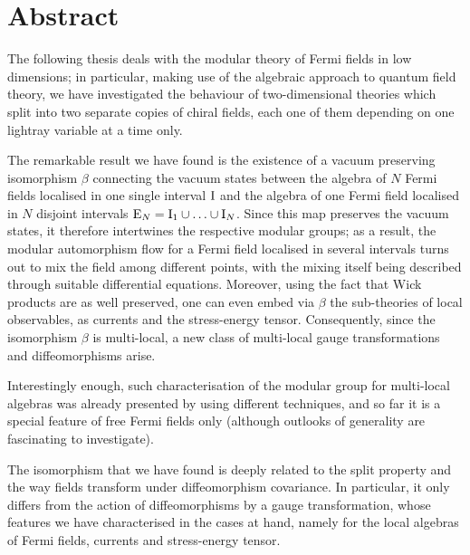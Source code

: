 \begingroup
\let\clearpage\relax
\let\cleardoublepage\relax
\let\cleardoublepage\relax

\chapter*{Abstract}
The following thesis deals with the modular theory of 
Fermi fields in low dimensions; in particular, making 
use of the algebraic approach to quantum field theory,
we have investigated the behaviour of two-dimensional 
theories which split into two separate copies of chiral
fields, each one of them depending on one lightray variable 
at a time only.

The remarkable result we have found is the existence of 
a vacuum preserving isomorphism $\beta$ connecting the 
vacuum states between the algebra of $N$ Fermi fields 
localised in one single interval $\textrm{I}$ and the algebra 
of one Fermi field localised in $N$ disjoint intervals 
$\textrm{E}_N=\textrm{I}_1\cup\ldots\cup \textrm{I}_N$. Since this 
map preserves the vacuum states, it therefore intertwines 
the respective modular groups; as a result, the modular 
automorphism flow for a Fermi field localised in several 
intervals turns out to mix the field among different 
points, with the mixing itself being described through 
suitable differential equations. Moreover, using the fact that
Wick products are as well preserved, one can even embed 
via $\beta$ the sub-theories of local observables,
as currents and the stress-energy tensor. Consequently,
since the isomorphism $\beta$ is multi-local, a 
new class of multi-local gauge transformations and 
diffeomorphisms arise. 

Interestingly enough, such characterisation of the 
modular group for multi-local algebras was already 
presented by \cite{CH:2009} using different
techniques, and so far it is a special feature of 
free Fermi fields only (although outlooks of generality
are fascinating to investigate).

\bigskip
The isomorphism that we have found is deeply related to 
the split property and the way fields transform under 
diffeomorphism covariance. In particular, it only differs 
from the action of diffeomorphisms by a gauge transformation,
whose features we have characterised in the cases at hand,
namely for the local algebras of Fermi fields, currents and 
stress-energy tensor.


